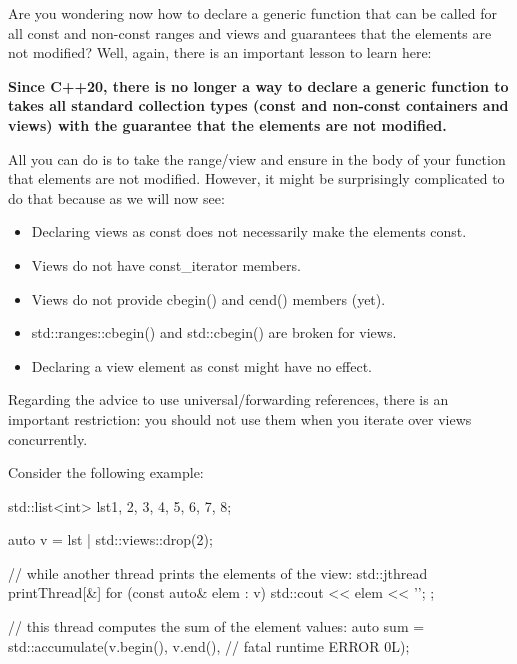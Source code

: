 Are you wondering now how to declare a generic function that can be called for all const and non-const ranges and views and guarantees that the elements are not modified? Well, again, there is an important lesson to learn here:

\textbf{Since C++20, there is no longer a way to declare a generic function to takes all standard collection types (const and non-const containers and views) with the guarantee that the elements are not modified.}

All you can do is to take the range/view and ensure in the body of your function that elements are not modified. However, it might be surprisingly complicated to do that because as we will now see:

\begin{itemize}
\item
Declaring views as const does not necessarily make the elements const.

\item
Views do not have const\_iterator members.

\item
Views do not provide cbegin() and cend() members (yet).

\item
std::ranges::cbegin() and std::cbegin() are broken for views.

\item
Declaring a view element as const might have no effect.
\end{itemize}


Regarding the advice to use universal/forwarding references, there is an important restriction: you should not use them when you iterate over views concurrently.

Consider the following example:

\begin{cpp}
std::list<int> lst{1, 2, 3, 4, 5, 6, 7, 8};

auto v = lst | std::views::drop(2);

// while another thread prints the elements of the view:
std::jthread printThread{[&] {
		for (const auto& elem : v) {
			std::cout << elem << '\n';
		}
}};

// this thread computes the sum of the element values:
auto sum = std::accumulate(v.begin(), v.end(), // fatal runtime ERROR
0L);
\end{cpp}

